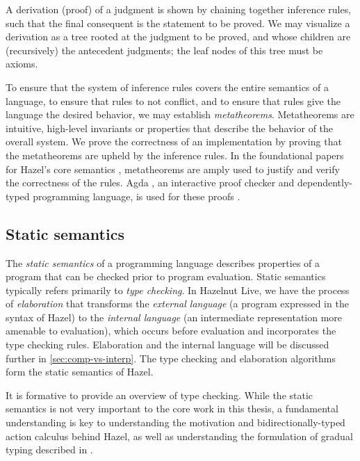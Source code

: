 A derivation (proof) of a judgment is shown by chaining together inference rules, such that the final consequent is the statement to be proved. We may visualize a derivation as a tree rooted at the judgment to be proved, and whose children are (recursively) the antecedent judgments; the leaf nodes of this tree must be axioms.

To ensure that the system of inference rules covers the entire semantics of a language, to ensure that rules to not conflict, and to ensure that rules give the language the desired behavior, we may establish \textit{metatheorems}. Metatheorems are intuitive, high-level invariants or properties that describe the behavior of the overall system. We prove the correctness of an implementation by proving that the metatheorems are upheld by the inference rules. In the foundational papers for Hazel's core semantics \cite{conf/popl/Hazelnut17,conf/popl/HazelnutLive19}, metatheorems are amply used to justify and verify the correctness of the rules. Agda \cite{bove2009brief}, an interactive proof checker and dependently-typed programming language, is used for these proofs \cite{agda2017_git,agda2019_git}.

\subsection{Static semantics}
\label{sec:static-semantics}

The \textit{static semantics} of a programming language describes properties of a program that can be checked prior to program evaluation. Static semantics typically refers primarily to \textit{type checking}. In Hazelnut Live, we have the process of \textit{elaboration} that transforms the \textit{external language} (a program expressed in the syntax of Hazel) to the \textit{internal language} (an intermediate representation more amenable to evaluation), which occurs before evaluation and incorporates the type checking rules. Elaboration and the internal language will be discussed further in \cref{sec:comp-vs-interp}. The type checking and elaboration algorithms form the static semantics of Hazel.

It is formative to provide an overview of type checking. While the static semantics is not very important to the core work in this thesis, a fundamental understanding is key to understanding the motivation and bidirectionally-typed action calculus behind Hazel, as well as understanding the formulation of gradual typing described in .

